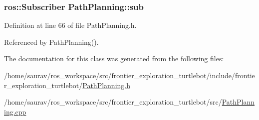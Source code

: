 \subsubsection[{\texorpdfstring{sub}{sub}}]{\setlength{\rightskip}{0pt plus 5cm}ros\+::\+Subscriber Path\+Planning\+::sub\hspace{0.3cm}{\ttfamily [private]}}\hypertarget{classPathPlanning_ad30204ed2c193139c5d5b3f8ed07bc8d}{}\label{classPathPlanning_ad30204ed2c193139c5d5b3f8ed07bc8d}


Definition at line 66 of file Path\+Planning.\+h.



Referenced by Path\+Planning().



The documentation for this class was generated from the following files\+:\begin{DoxyCompactItemize}
\item 
/home/saurav/ros\+\_\+workspace/src/frontier\+\_\+exploration\+\_\+turtlebot/include/frontier\+\_\+exploration\+\_\+turtlebot/\hyperlink{PathPlanning_8h}{Path\+Planning.\+h}\item 
/home/saurav/ros\+\_\+workspace/src/frontier\+\_\+exploration\+\_\+turtlebot/src/\hyperlink{PathPlanning_8cpp}{Path\+Planning.\+cpp}\end{DoxyCompactItemize}

